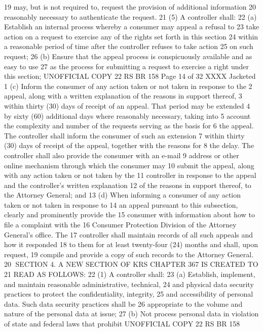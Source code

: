 19 may, but is not required to, request the provision of additional information
20 reasonably necessary to authenticate the request.
21 (5) A controller shall:
22 (a) Establish an internal process whereby a consumer may appeal a refusal to
23 take action on a request to exercise any of the rights set forth in this section
24 within a reasonable period of time after the controller refuses to take action
25 on such request;
26 (b) Ensure that the appeal process is conspicuously available and as easy to use
27 as the process for submitting a request to exercise a right under this section;
UNOFFICIAL COPY 22 RS BR 158
Page 14 of 32
XXXX Jacketed
1 (c) Inform the consumer of any action taken or not taken in response to the
2 appeal, along with a written explanation of the reasons in support thereof,
3 within thirty (30) days of receipt of an appeal. That period may be extended
4 by sixty (60) additional days where reasonably necessary, taking into
5 account the complexity and number of the requests serving as the basis for
6 the appeal. The controller shall inform the consumer of such an extension
7 within thirty (30) days of receipt of the appeal, together with the reasons for
8 the delay. The controller shall also provide the consumer with an e-mail
9 address or other online mechanism through which the consumer may
10 submit the appeal, along with any action taken or not taken by the
11 controller in response to the appeal and the controller's written explanation
12 of the reasons in support thereof, to the Attorney General; and
13 (d) When informing a consumer of any action taken or not taken in response to
14 an appeal pursuant to this subsection, clearly and prominently provide the
15 consumer with information about how to file a complaint with the
16 Consumer Protection Division of the Attorney General's office. The
17 controller shall maintain records of all such appeals and how it responded
18 to them for at least twenty-four (24) months and shall, upon request,
19 compile and provide a copy of such records to the Attorney General.
20 SECTION 4. A NEW SECTION OF KRS CHAPTER 367 IS CREATED TO
21 READ AS FOLLOWS:
22 (1) A controller shall:
23 (a) Establish, implement, and maintain reasonable administrative, technical,
24 and physical data security practices to protect the confidentiality, integrity,
25 and accessibility of personal data. Such data security practices shall be
26 appropriate to the volume and nature of the personal data at issue;
27 (b) Not process personal data in violation of state and federal laws that prohibit 
UNOFFICIAL COPY 22 RS BR 158
